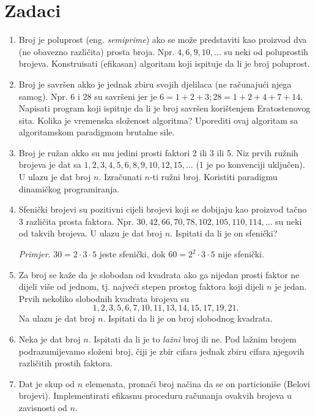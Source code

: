  
 \section*{Zadaci}
 
 \begin{enumerate}
 	\item Broj je poluprost (eng. \textit{semiprime}) ako se može predstaviti
 	kao proizvod dva (ne obavezno različita) prosta broja. Npr. $4, 6, 9, 10, \ldots$ su neki od poluprostih brojeva. Konstruisati (efikasan) algoritam koji ispituje da li je broj poluprost.
 	\item Broj je savršen akko je jednak zbiru svojih djelilaca (ne računajući njega samog). Npr. 6 i 28 su savršeni jer je $6 = 1 + 2 + 3; 28 = 1 + 2 + 4 + 7 + 14$. Napisati program koji ispituje da li je broj savršen korištenjem Eratostenovog sita. Kolika je vremenska složenost algoritma? Uporediti ovaj algoritam sa algoritamskom paradigmom brutalne sile.
 	\item Broj je ružan akko su mu jedini prosti faktori 2 ili 3 ili 5. Niz prvih ružnih brojeva je dat sa $1, 2, 3, 4, 5, 6, 8, 9, 10, 12, 15, \ldots$ (1 je po
 	konvenciji uključen). U ulazu je  dat broj $n$. Izračunati $n$-ti ružni broj. Koristiti paradigmu dinamičkog programiranja.
 	\item Sfenički brojevi su pozitivni cijeli brojevi koji se dobijaju kao proizvod tačno 3 različita prosta faktora. Npr. $30, 42, 66, 70, 78, 102, 105, 110, 114, \ldots$ su neki od takvih brojeva. U ulazu je dat broj $n$. Ispitati da li je on sfenički? 
 	
 	\textit{Primjer}. $30=2 \cdot 3 \cdot 5$ jeste sfenički, dok $60 = 2^2 \cdot 3 \cdot 5 $ nije sfenički. 
 	\item Za broj se kaže da je slobodan od kvadrata ako ga nijedan
 	prosti faktor ne dijeli više od jednom, tj. najveći stepen prostog
 	faktora koji dijeli $n$  je jedan.  Prvih nekoliko slobodnih kvadrata brojeva su $$1, 2, 3, 5, 6, 7,
 	10, 11, 13, 14, 15, 17, 19, 21.$$   Na ulazu je dat broj $n$. Ispitati da li je on broj 	slobodnog kvadrata.
 	\item Neka je dat broj $n$. Ispitati da li je to \textit{lažni} broj ili ne.
 	Pod lažnim brojem podrazumijevamo složeni broj, čiji je zbir cifara jednak zbiru cifara njegovih različitih prostih faktora.%
 	
 	\item Dat je skup od $n$ elemenata, pronaći broj načina da se on particioniše (Belovi brojevi). Implementirati efikasnu proceduru računanja ovakvih brojeva u zavisnosti od $n$.  %
 \end{enumerate}